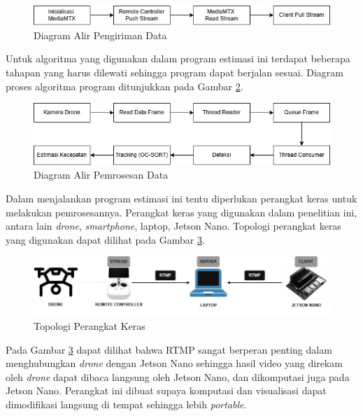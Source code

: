 \begin{figure} [H] \centering
  \includegraphics[scale=0.7]{bab3/pengirimandata.jpg}
  \caption{Diagram Alir Pengiriman Data}
  \label{fig:alurdata}
\end{figure}

Untuk algoritma yang digunakan dalam program estimasi ini terdapat beberapa tahapan yang harus dilewati sehingga program dapat berjalan sesuai. Diagram proses algoritma program ditunjukkan pada Gambar \ref{fig:diagramproses}.

\begin{figure} [H] \centering
  \includegraphics[scale=0.7]{bab3/algoritma.jpg}
  \caption{Diagram Alir Pemrosesan Data}
  \label{fig:diagramproses}
\end{figure}

Dalam menjalankan program estimasi ini tentu diperlukan perangkat keras untuk melakukan pemrosesannya. Perangkat keras yang digunakan dalam penelitian ini, antara lain \emph{drone}, \emph{smartphone}, laptop, Jetson Nano. Topologi perangkat keras yang digunakan dapat dilihat pada Gambar \ref{fig:topologihardware}.

\begin{figure} [H] \centering
  \includegraphics[scale=0.5]{bab3/topologi-hardware.jpg}
  \caption{Topologi Perangkat Keras}
  \label{fig:topologihardware}
\end{figure}

Pada Gambar \ref{fig:topologihardware} dapat dilihat bahwa RTMP sangat berperan penting dalam menghubungkan \emph{drone} dengan Jetson Nano sehingga hasil video yang direkam oleh \emph{drone} dapat dibaca langsung oleh Jetson Nano, dan dikomputasi juga pada Jetson Nano. Perangkat ini dibuat supaya komputasi dan visualisasi dapat dimodifikasi langsung di tempat sehingga lebih \emph{portable}.





